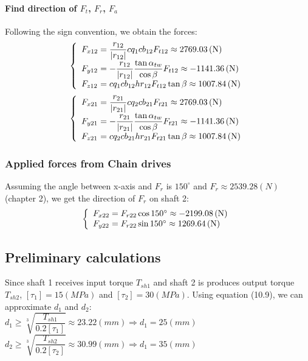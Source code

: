 \paragraph{Find direction of $ F_{t} $, $ F_r $, $ F_a $}
Following the sign convention, we obtain the forces:
\[
\left\{ 
\begin{array}{l@{{}={}}l}
F_{x12}& \dfrac{r_{12}}{|r_{12}|}cq_1cb_{12}F_{t12}\approx2769.03\unit{(N)}\\

F_{y12}& -\dfrac{r_{12}}{|r_{12}|}\dfrac{\tan\alpha_{tw}}{\cos\beta}F_{t12}\approx-1141.36\unit{(N)}\\

F_{z12}& cq_1cb_{12}hr_{12}F_{t12}\tan\beta\approx1007.84\unit{(N)}\\ 
\end{array}
\right.
\]
\[
\left\{ 
\begin{array}{l@{{}={}}l}
F_{x21}& \dfrac{r_{21}}{|r_{21}|}cq_2cb_{21}F_{t21}\approx2769.03\unit{(N)}\\

F_{y21}& -\dfrac{r_{21}}{|r_{21}|}\dfrac{\tan\alpha_{tw}}{\cos\beta}F_{t21}\approx-1141.36\unit{(N)}\\

F_{z21}& cq_2cb_{21}hr_{21}F_{t21}\tan\beta\approx1007.84\unit{(N)}\\ 
\end{array}
\right.
\]

\subsubsection{Applied forces from Chain drives}
Assuming the angle between x-axis and $ F_r $ is $ 150^\circ $ and $ F_r \approx 2539.28\unit{(N)} $ (chapter 2), we get the direction of $ F_r $ on shaft 2:
\[
\left\{ 
\begin{array}{l@{{}={}}l}
F_{x22}& F_{r22}\cos150^\circ\approx-2199.08\unit{(N)}\\

F_{y22}& F_{r22}\sin150^\circ\approx1269.64\unit{(N)}\\
\end{array}
\right.
\]

\subsection{Preliminary calculations}
Since shaft 1 receives input torque $ T_{sh1} $ and shaft 2 is produces output torque $ T_{sh2} $, $ [\tau_1] = 15\unit{(MPa)}$ and $ [\tau_2]=30\unit{(MPa)} $. Using equation (10.9), we can approximate $ d_1 $ and $ d_2 $:\\
$ d_1 \geq \sqrt[3]{\dfrac{T_{sh1}}{0.2[\tau_1]}} \approx 23.22\unit{(mm)}\Rightarrow d_1 = 25\unit{(mm)}$\\
$ d_2 \geq \sqrt[3]{\dfrac{T_{sh2}}{0.2[\tau_2]}} \approx 30.99\unit{(mm)}\Rightarrow d_1 = 35\unit{(mm)}$
